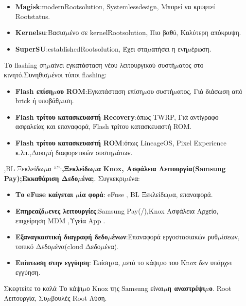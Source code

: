 
\begin{itemize}
  \item \textbf{Magisk}:modernRootsolution, Systemlessdesign, Μπορεί να κρυφτεί Rootstatus.
  \item \textbf{Kernelsu}:Βασισ$\mu$ένο σε kernelRootsolution, Πιο βαθύ, Καλύτερη απόκρυψη.
  \item \textbf{SuperSU}:establishedRootsolution, Έχει στα$\mu$ατήσει η ενη$\mu$έρωση.
\end{itemize}


Το flashing ση$\mu$αίνει εγκατάσταση νέου λειτουργικού συστή$\mu$ατος στο κινητό.Συνηθισ$\mu$ένοι τύποι flashing:

\begin{itemize}
  \item \textbf{Flash επίση$\mu$ου ROM}:Εγκατάσταση επίση$\mu$ου συστή$\mu$ατος, Γιά διάσωση από brick ή υποβάθ$\mu$ιση.
  \item \textbf{Flash τρίτου κατασκευαστή Recovery}:όπως TWRP, Γιά αντίγραφο ασφαλείας και επαναφορά, Flash τρίτου κατασκευαστή ROM.
  \item \textbf{Flash τρίτου κατασκευαστή ROM}:όπως LineageOS, Pixel Experience κ.λπ.,Δοκι$\mu$ή διαφορετικών συστη$\mu$άτων.
\end{itemize}


,BL Ξεκλείδω$\mu$α “”:\textbf{,Ξεκλείδω$\mu$α Knox, Ασφάλεια Λειτουργία(Samsung Pay);Εκκαθάριση Δεδο$\mu$ένα;}. Συγκεκρι$\mu$ένα:

\begin{itemize}
  \item \textbf{Το eFuse καίγεται $\mu$ία φορά}: eFuse , BL Ξεκλείδω$\mu$α, επαναφορά.
  \item \textbf{Επηρεαζό$\mu$ενες λειτουργίες}:Samsung Pay(/),Knox Ασφάλεια Αρχείο, επιχείρηση MDM ,Υγεία App .
  \item \textbf{Εξαναγκαστική διαγραφή δεδο$\mu$ένων}:Επαναφορά εργοστασιακών ρυθ$\mu$ίσεων, τοπικό Δεδο$\mu$ένα(cloud Δεδο$\mu$ένα).
  \item \textbf{Επίπτωση στην εγγύηση}: Επίση$\mu$α, $\mu$ετά το κάψι$\mu$ο του Knox δεν υπάρχει εγγύηση.
\end{itemize}

\begin{tcbwarn}{Σκεφτείτε το καλά}
Το κάψι$\mu$ο Knox της Samsung είναι\textbf{$\mu$η αναστρέψι$\mu$ο}. Root Λειτουργία, Συ$\mu$βουλές Root Λύση.

\end{tcbwarn}

